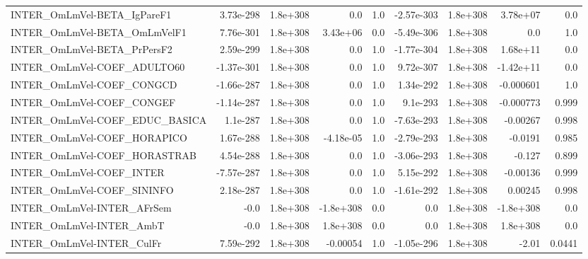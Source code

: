 \begin{tabular}{lrrrrrrrr}
INTER\_OmLmVel-BETA\_IgPareF1           &   3.73e-298 &     1.8e+308 &        0.0 &      1.0 & -2.57e-303 &    1.8e+308 &     3.78e+07 &           0.0 \\
INTER\_OmLmVel-BETA\_OmLmVelF1          &   7.76e-301 &     1.8e+308 &   3.43e+06 &      0.0 & -5.49e-306 &    1.8e+308 &          0.0 &           1.0 \\
INTER\_OmLmVel-BETA\_PrPersF2           &   2.59e-299 &     1.8e+308 &        0.0 &      1.0 & -1.77e-304 &    1.8e+308 &     1.68e+11 &           0.0 \\
INTER\_OmLmVel-COEF\_ADULTO60           &  -1.37e-301 &     1.8e+308 &        0.0 &      1.0 &  9.72e-307 &    1.8e+308 &    -1.42e+11 &           0.0 \\
INTER\_OmLmVel-COEF\_CONGCD             &  -1.66e-287 &     1.8e+308 &        0.0 &      1.0 &  1.34e-292 &    1.8e+308 &    -0.000601 &           1.0 \\
INTER\_OmLmVel-COEF\_CONGEF             &  -1.14e-287 &     1.8e+308 &        0.0 &      1.0 &   9.1e-293 &    1.8e+308 &    -0.000773 &         0.999 \\
INTER\_OmLmVel-COEF\_EDUC\_BASICA        &    1.1e-287 &     1.8e+308 &        0.0 &      1.0 & -7.63e-293 &    1.8e+308 &     -0.00267 &         0.998 \\
INTER\_OmLmVel-COEF\_HORAPICO           &   1.67e-288 &     1.8e+308 &  -4.18e-05 &      1.0 & -2.79e-293 &    1.8e+308 &      -0.0191 &         0.985 \\
INTER\_OmLmVel-COEF\_HORASTRAB          &   4.54e-288 &     1.8e+308 &        0.0 &      1.0 & -3.06e-293 &    1.8e+308 &       -0.127 &         0.899 \\
INTER\_OmLmVel-COEF\_INTER              &  -7.57e-287 &     1.8e+308 &        0.0 &      1.0 &  5.15e-292 &    1.8e+308 &     -0.00136 &         0.999 \\
INTER\_OmLmVel-COEF\_SININFO            &   2.18e-287 &     1.8e+308 &        0.0 &      1.0 & -1.61e-292 &    1.8e+308 &      0.00245 &         0.998 \\
INTER\_OmLmVel-INTER\_AFrSem            &        -0.0 &     1.8e+308 &  -1.8e+308 &      0.0 &        0.0 &    1.8e+308 &    -1.8e+308 &           0.0 \\
INTER\_OmLmVel-INTER\_AmbT              &        -0.0 &     1.8e+308 &   1.8e+308 &      0.0 &        0.0 &    1.8e+308 &     1.8e+308 &           0.0 \\
INTER\_OmLmVel-INTER\_CulFr             &   7.59e-292 &     1.8e+308 &   -0.00054 &      1.0 & -1.05e-296 &    1.8e+308 &        -2.01 &        0.0441 \\

\end{tabular}

